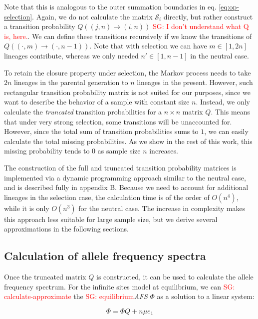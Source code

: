 \documentclass[review]{elsarticle}
\newcommand{\ra}{\rightarrow}
\newcommand{\sgcomment}[1]{\textcolor{red}{SG: #1}}
\begin{document}
Note that this is analogous to the outer summation boundaries in eq. \eqref{eq:op-selection}. Again,
we do not calculate the matrix $\mathcal{S}_i$ directly, but rather construct a transition
probability $Q((j,n)\ra(i,n))$ \sgcomment{I don't understand what Q is, here.}. We can define these transitions recursively if we know the
transitions of $Q((\cdot,m)\ra(\cdot,n-1))$. Note that with selection we can have $m \in [1, 2n]$
lineages contribute, whereas we only needed $n' \in [1, n-1]$ in the neutral case.

To retain the closure property under selection, the Markov process needs to take $2n$ lineages in
the parental generation to $n$ lineages in the present. However, such rectangular transition
probability matrix is not suited for our purposes, since we want to describe the behavior of a
sample with constant size $n$. Instead, we only calculate the \textit{truncated} transition
probabilities for a $n \times n$ matrix $Q$. This means that under very strong selection, some
transitions will be unaccounted for. However, since the total sum of transition probabilities sums
to $1$, we can easily calculate the total missing probabilities. As we show in the rest of this
work, this missing probability tends to $0$ as sample size $n$ increases.

The construction of the full and truncated transition probability matrices is implemented via a
dynamic programming approach similar to the neutral case, and is described fully in
appendix B. Because we need to account for additional lineages in the selection case, the
calculation time is of the order of $O(n^4)$, while it is only $O(n^3)$ for the neutral case. The
increase in complexity makes this approach less suitable for large sample size, but we derive
several approximations in the following sections.

\subsection{Calculation of allele frequency spectra}
\label{subsec:afs}

Once the truncated matrix $Q$ is constructed, it can be used to calculate the allele frequency
spectrum. For the infinite sites model at equilibrium, we can \sgcomment{calculate-approximate} the \sgcomment{equilibrium}\textit{AFS} $\Phi$ as a
solution to a linear system:

\begin{equation}
  \label{eq:sfs-calc}
  \Phi = \Phi Q + n \mu e_1
\end{equation}
\end{document}
